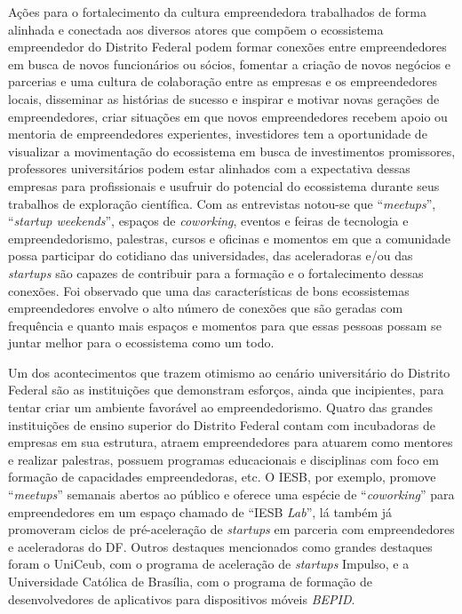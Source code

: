Ações para o fortalecimento da cultura empreendedora trabalhados de forma alinhada e conectada aos diversos atores que compõem o ecossistema empreendedor do Distrito Federal podem formar conexões entre empreendedores em busca de novos funcionários ou sócios, fomentar a criação de novos negócios e parcerias e uma cultura de colaboração entre as empresas e os empreendedores locais, disseminar as histórias de sucesso e inspirar e motivar novas gerações de empreendedores, criar situações em que novos empreendedores recebem apoio ou mentoria de empreendedores experientes, investidores tem a oportunidade de visualizar a movimentação do ecossistema em busca de investimentos promissores, professores universitários podem estar alinhados com a expectativa dessas empresas para profissionais e usufruir do potencial do ecossistema durante seus trabalhos de exploração científica. Com as entrevistas notou-se que ``\textit{meetups}'', ``\textit{startup weekends}'', espaços de \textit{coworking}, eventos e feiras de tecnologia e empreendedorismo, palestras, cursos e oficinas e momentos em que a comunidade possa participar do cotidiano das universidades, das aceleradoras e/ou das \textit{startups} são capazes de contribuir para a formação e o fortalecimento dessas conexões. Foi observado que uma das características de bons ecossistemas empreendedores envolve o alto número de conexões que são geradas com frequência e quanto mais espaços e momentos para que essas pessoas possam se juntar melhor para o ecossistema como um todo.

Um dos acontecimentos que trazem otimismo ao cenário universitário do Distrito Federal são as instituições que demonstram esforços, ainda que incipientes, para tentar criar um ambiente favorável ao empreendedorismo. Quatro das grandes instituições de ensino superior do Distrito Federal contam com incubadoras de empresas em sua estrutura, atraem empreendedores para atuarem como mentores e realizar palestras, possuem programas educacionais e disciplinas com foco em formação de capacidades empreendedoras, etc. O IESB, por exemplo, promove ``\textit{meetups}'' semanais abertos ao público e oferece uma espécie de ``\textit{coworking}'' para empreendedores em um espaço chamado de ``IESB \textit{Lab}'', lá também já promoveram ciclos de pré-aceleração de \textit{startups} em parceria com empreendedores e aceleradoras do DF. Outros destaques mencionados como grandes destaques foram o UniCeub, com o programa de aceleração de \textit{startups} Impulso, e a Universidade Católica de Brasília, com o programa de formação de desenvolvedores de aplicativos para dispositivos móveis \textit{BEPID}.


